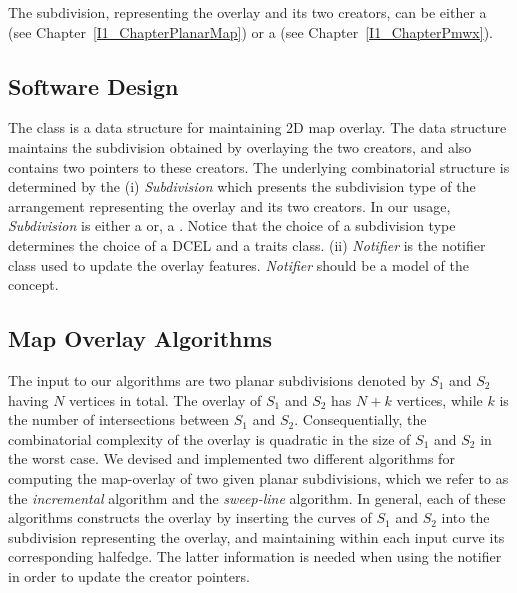 \begin{ccTexOnly}

The subdivision, representing the overlay and its two creators, 
can be either a  
(see Chapter~\ref{I1_ChapterPlanarMap}) 
or a  
(see Chapter~\ref{I1_ChapterPmwx}).

\subsection*{Software Design}
The  class 
is a data structure for maintaining 2D map overlay.
The data structure maintains the subdivision obtained by overlaying 
the two creators,
and also contains two pointers to these creators. 
The underlying combinatorial structure is determined by the
(i) {\it Subdivision} which presents the subdivision type of the arrangement 
representing the overlay and its two creators. 
In our usage, {\it Subdivision} is either a  or, 
a .
Notice that the choice of a subdivision type determines the choice 
of a DCEL and a traits class.
(ii) {\it Notifier} is the notifier class used to update the overlay features. 
{\it Notifier} should be a model of the 
 concept.

\subsection*{Map Overlay Algorithms}
The input to our algorithms are two planar subdivisions denoted by $S_1$ and $S_2$ having 
$N$ vertices in total. The overlay of $S_1$ and $S_2$ has $N+k$ vertices, 
while $k$ is the number of intersections between $S_1$ and $S_2$. 
Consequentially, the combinatorial complexity of the overlay is quadratic 
in the size of $S_1$ and $S_2$ in the worst case.
We devised and implemented two different algorithms for computing the map-overlay 
of two given planar subdivisions, 
which we refer to as the {\it incremental} algorithm and the {\it sweep-line} algorithm. 
In general, each of these algorithms constructs the overlay by inserting 
the curves of $S_1$ and $S_2$ into the subdivision representing the overlay,
and maintaining within each input curve its corresponding halfedge. 
The latter information is needed when using the notifier in order to
update the creator pointers. 


\end{ccTexOnly}
